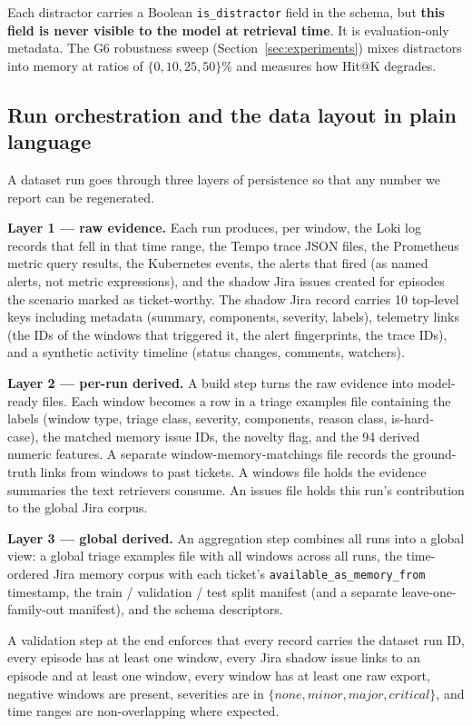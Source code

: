 Each distractor carries a Boolean \texttt{is\_distractor} field in the schema, but \textbf{this field is never visible to the model at retrieval time}. It is evaluation-only metadata. The G6 robustness sweep (Section~\ref{sec:experiments}) mixes distractors into memory at ratios of $\{0, 10, 25, 50\}\%$ and measures how Hit@K degrades.

\subsection{Run orchestration and the data layout in plain language}

A dataset run goes through three layers of persistence so that any number we report can be regenerated.

\textbf{Layer 1 --- raw evidence.} Each run produces, per window, the Loki log records that fell in that time range, the Tempo trace JSON files, the Prometheus metric query results, the Kubernetes events, the alerts that fired (as named alerts, not metric expressions), and the shadow Jira issues created for episodes the scenario marked as ticket-worthy. The shadow Jira record carries 10 top-level keys including metadata (summary, components, severity, labels), telemetry links (the IDs of the windows that triggered it, the alert fingerprints, the trace IDs), and a synthetic activity timeline (status changes, comments, watchers).

\textbf{Layer 2 --- per-run derived.} A build step turns the raw evidence into model-ready files. Each window becomes a row in a triage examples file containing the labels (window type, triage class, severity, components, reason class, is-hard-case), the matched memory issue IDs, the novelty flag, and the 94 derived numeric features. A separate window-memory-matchings file records the ground-truth links from windows to past tickets. A windows file holds the evidence summaries the text retrievers consume. An issues file holds this run's contribution to the global Jira corpus.

\textbf{Layer 3 --- global derived.} An aggregation step combines all runs into a global view: a global triage examples file with all windows across all runs, the time-ordered Jira memory corpus with each ticket's \texttt{available\_as\_memory\_from} timestamp, the train / validation / test split manifest (and a separate leave-one-family-out manifest), and the schema descriptors.

A validation step at the end enforces that every record carries the dataset run ID, every episode has at least one window, every Jira shadow issue links to an episode and at least one window, every window has at least one raw export, negative windows are present, severities are in $\{none, minor, major, critical\}$, and time ranges are non-overlapping where expected.

